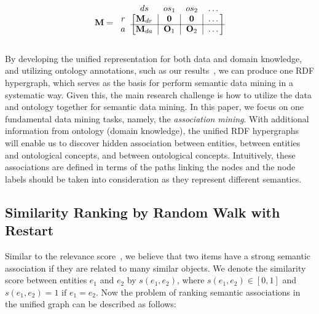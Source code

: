 \begin{equation}
\label{striped_M}
\mathbf{M}=\begin{blockarray}{ccccc}
                ~ & ds & os_1 & os_2 & \dots \\
            \begin{block}{c[c|c|c|c]}
                r   &   \mathbf{M}_{dr}  &   \mathbf{0}   &   \mathbf{0}   &   \dots \\
                \cline{2-5}
                a   &   \mathbf{M}_{da}  &   \mathbf{O}_1 &   \mathbf{O}_2 &   \dots \\
            \end{block}
        \end{blockarray}
\end{equation}

By developing the unified representation for both data and domain knowledge, and utilizing ontology annotations, such as our results~\cite{LePendu2010}, we can produce one RDF hypergraph, which serves as the basis for perform semantic data mining in a systematic way. Given this, the main research challenge is how to utilize the data and ontology together for semantic data mining. In this paper, we focus on one fundamental data mining tasks, namely, the {\em association mining}. With additional information from ontology (domain knowledge), the unified RDF hypergraphs will enable us to discover hidden association between entities, between entities and ontological concepts, and between ontological concepts. Intuitively, these associations are defined in terms of the paths linking the nodes and the node labels should be taken into consideration as they represent different semantics.



\subsection{Similarity Ranking by Random Walk with Restart}

Similar to the relevance score~\cite{SunEtal05}, we believe that two items have a strong semantic association if they are related to many similar objects. We denote the similarity score between entities $e_1$ and $e_2$ by $s(e_1, e_2)$, where $s(e_1,e_2) \in [0, 1]$ and $s(e_1, e_2) = 1 \text{ if } e_1 = e_2$. Now the problem of ranking semantic associations in the unified graph can be described as follows:


